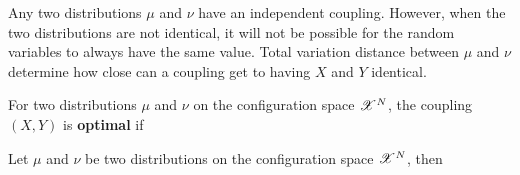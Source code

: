 \documentclass[letterpaper,english,10pt]{article}
\begin{document}
Any two distributions $\mu$ and $\nu$ have an independent coupling. 
However, when the two distributions are not identical, 
it will not be possible for the random variables to always have the same value. 
Total variation distance between $\mu$ and $\nu$ determine how close can a coupling get to having $X$ and $Y$ identical. 
\begin{defn}
For two distributions $\mu$ and $\nu$ on the configuration space $\mathscr{X}^N$, 
the coupling $(X,Y)$ is \textbf{optimal} if  
\end{defn}
\begin{prop}
Let $\mu$ and $\nu$ be two distributions on the configuration space $\mathscr{X}^N$, then 
\end{prop}
\end{document}
